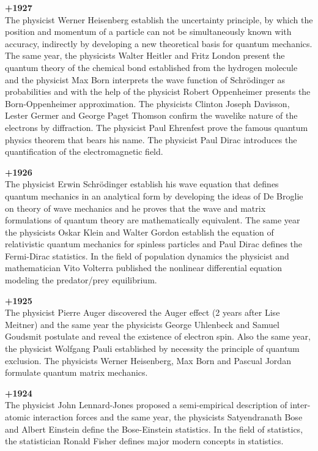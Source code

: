 \textbf{+1927}\\
The physicist Werner Heisenberg establish the uncertainty principle, by which the position and momentum of a particle can not be simultaneously known with accuracy, indirectly by developing a new theoretical basis for quantum mechanics. The same year, the physicists Walter Heitler and Fritz London present the quantum theory of the chemical bond established from the hydrogen molecule and the physicist Max Born interprets the wave function of Schrödinger as probabilities and with the help of the physicist Robert Oppenheimer presents the Born-Oppenheimer approximation. The physicists Clinton Joseph Davisson, Lester Germer and George Paget Thomson confirm the wavelike nature of the electrons by diffraction. The physicist Paul Ehrenfest prove the famous quantum physics theorem that bears his name. The physicist Paul Dirac introduces the quantification of the electromagnetic field.

\textbf{+1926}\\
The physicist Erwin Schrödinger establish his wave equation that defines quantum mechanics in an analytical form by developing the ideas of De Broglie on theory of wave mechanics and he proves that the wave and matrix formulations of quantum theory are mathematically equivalent. The same year the physicists Oskar Klein and Walter Gordon establish the equation of relativistic quantum mechanics for spinless particles and Paul Dirac defines the Fermi-Dirac statistics. In the field of population dynamics the physicist and mathematician Vito Volterra published the nonlinear differential equation modeling the predator/prey equilibrium.

\textbf{+1925}\\
The physicist Pierre Auger discovered the Auger effect (2 years after Lise Meitner) and the same year the physicists George Uhlenbeck and Samuel Goudsmit postulate and reveal the existence of electron spin. Also the same year, the physicist Wolfgang Pauli established by necessity the principle of quantum exclusion. The physicists Werner Heisenberg, Max Born and Pascual Jordan formulate quantum matrix mechanics.

\textbf{+1924}\\
The physicist John Lennard-Jones proposed a semi-empirical description of inter-atomic interaction forces and the same year, the physicists Satyendranath Bose and Albert Einstein define the Bose-Einstein statistics. In the field of statistics, the statistician Ronald Fisher defines major modern concepts in statistics.


